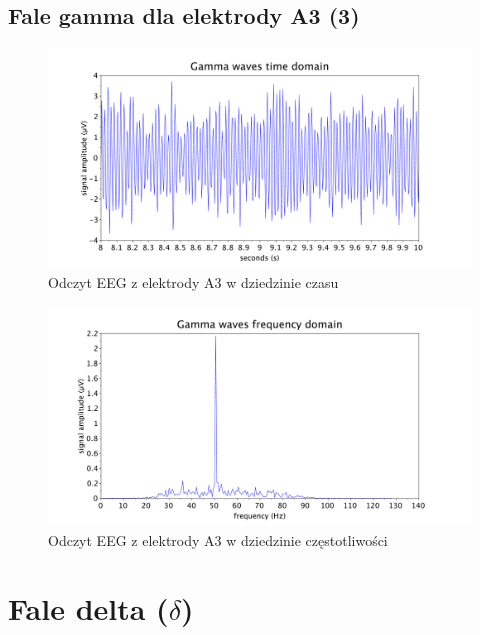 \documentclass{article}
\begin{document}
    \subsection{Fale gamma dla elektrody A3 (3)}
    \begin{figure}[H]
        \hspace*{-1.5cm}
        \includegraphics[width=\linewidth+3.2cm]{gamma_time.pdf}
        \caption{Odczyt EEG z elektrody A3 w dziedzinie czasu}
    \end{figure}
    \begin{figure}[H]
        \hspace*{-1.5cm}
        \includegraphics[width=\linewidth+3cm]{gamma_freq.pdf}
        \caption{Odczyt EEG z elektrody A3 w dziedzinie częstotliwości}
    \end{figure}

\newpage
\section{Fale delta ($\delta$)}
\end{document}

